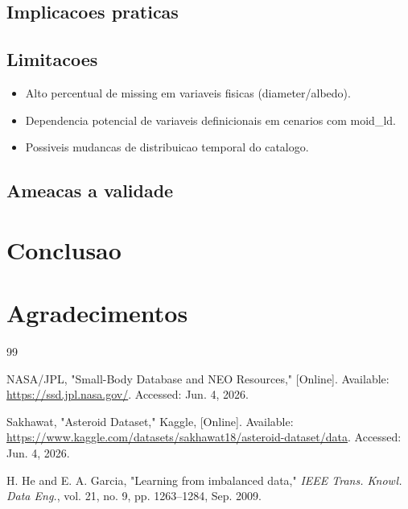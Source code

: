 \documentclass[conference]{IEEEtran}
\begin{document}
\subsection{Implicacoes praticas}

\subsection{Limitacoes}
\begin{itemize}[leftmargin=*]
    \item Alto percentual de missing em variaveis fisicas (diameter/albedo).
    \item Dependencia potencial de variaveis definicionais em cenarios com moid\_ld.
    \item Possiveis mudancas de distribuicao temporal do catalogo.
\end{itemize}

\subsection{Ameacas a validade}

\section{Conclusao}

\section*{Agradecimentos}

\begin{thebibliography}{99}

NASA/JPL, "Small-Body Database and NEO Resources," [Online]. Available: \url{https://ssd.jpl.nasa.gov/}. Accessed: Jun. 4, 2026.

Sakhawat, "Asteroid Dataset," Kaggle, [Online]. Available: \url{https://www.kaggle.com/datasets/sakhawat18/asteroid-dataset/data}. Accessed: Jun. 4, 2026.

H. He and E. A. Garcia, "Learning from imbalanced data," \textit{IEEE Trans. Knowl. Data Eng.}, vol. 21, no. 9, pp. 1263--1284, Sep. 2009.

\end{thebibliography}
\end{document}
